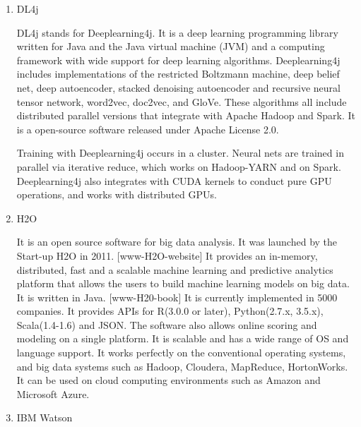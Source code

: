 \begin{enumerate}
\item {} 
DL4j

DL4j stands for Deeplearning4j. \label{\detokenize{i524/technologies:id102}}{\hyperref[\detokenize{i524/technologies:www-dl4j}]{\sphinxcrossref{{[}92{]}}}} It is a deep
learning programming library written for Java and the Java virtual
machine (JVM) and a computing framework with wide support for deep
learning algorithms. Deeplearning4j includes implementations of
the restricted Boltzmann machine, deep belief net, deep
autoencoder, stacked denoising autoencoder and recursive neural
tensor network, word2vec, doc2vec, and GloVe. These algorithms all
include distributed parallel versions that integrate with Apache
Hadoop and Spark. It is a open-source software released under
Apache License 2.0.

Training with Deeplearning4j occurs in a cluster. Neural nets are
trained in parallel via iterative reduce, which works on
Hadoop-YARN and on Spark. Deeplearning4j also integrates with CUDA
kernels to conduct pure GPU operations, and works with distributed
GPUs.

\item {} 
H2O

It is an open source software for big data analysis. It was
launched by the Start-up H2O in 2011. {[}www-H2O-website{]} It
provides an in-memory, distributed, fast and a scalable machine
learning and predictive analytics platform that allows the users
to build machine learning models on big data. It is written in
Java. {[}www-H20-book{]} It is currently implemented in 5000
companies. It provides APIs for R(3.0.0 or later), Python(2.7.x,
3.5.x), Scala(1.4-1.6) and JSON. The software also allows online
scoring and modeling on a single platform.  It is scalable and has
a wide range of OS and language support. It works perfectly on the
conventional operating systems, and big data systems such as
Hadoop, Cloudera, MapReduce, HortonWorks. \label{\detokenize{i524/technologies:id105}}{\hyperref[\detokenize{i524/technologies:www-h20-wiki}]{\sphinxcrossref{{[}93{]}}}} It
can be used on cloud computing environments such as Amazon and
Microsoft Azure.

\item {} 
IBM Watson


\end{enumerate}
